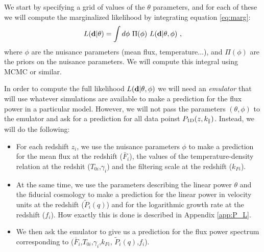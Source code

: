We start by specifying a grid of values of the $\theta$ parameters, and for
each of these we will compute the marginalized likelihood by integrating
equation \ref{eq:marg}:
\begin{equation} 
 L(\mathbf{d} | \theta)
  = \int d\phi ~ \Pi(\phi) ~ L(\mathbf{d} | \theta, \phi) ~,
\end{equation}
where $\phi$ are the nuisance parameters (mean flux, temperature...), and 
$\Pi(\phi)$ are the priors on the nuisance parameters.
We will compute this integral using MCMC or similar. 


In order to compute the full likelihood $L(\mathbf{d} | \theta, \phi)$ we will
need an \textit{emulator} that will use whatever simulations are available
to make a prediction for the flux power in a particular model.
However, we will not pass the parameters $(\theta,\phi)$ to the emulator
and ask for a prediction for all data poinst $P_{\rm 1D}(z,k_\parallel)$.
Instead, we will do the following:
\begin{itemize}
 \item For each redshift $z_i$, we use the nuisance parameters $\phi$ to
  make a prediction for the mean flux at the redshift ($\bar F_i$), the
  values of the temperature-density relation at the redshit 
  ($T_{0i}$,$\gamma_i$) and the filtering scale at the redshift ($k_{Fi}$).
 \item At the same time, we use the parameters describing the linear power
  $\theta$ and the fiducial cosmology to make a prediction for the linear
  power in velocity units at the redshift ($\tilde P_i(q)$) and for the
  logarithmic growth rate at the redshift ($f_i$).
  How exactly this is done is described in Appendix \ref{app:P_L}.
 \item We then ask the emulator to give us a prediction for the flux power
  spectrum corresponding to ($\bar F_i$,$T_{0i}$,$\gamma_i$,$k_{Fi}$,
  $\tilde P_i(q)$,$f_i$).
\end{itemize}


